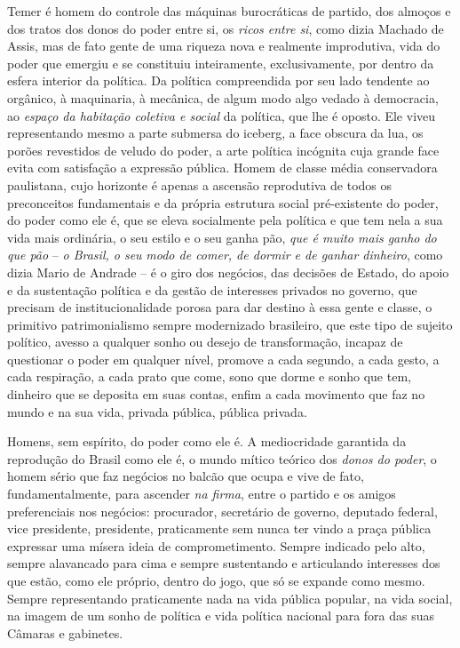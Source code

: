 Temer é homem do controle das máquinas burocráticas de partido, dos
almoços e dos tratos dos donos do poder entre si, os \emph{ricos entre
si}, como dizia Machado de Assis, mas de fato gente de uma riqueza nova
e realmente improdutiva, vida do poder que emergiu e se constituiu
inteiramente, exclusivamente, por dentro da esfera interior da política.
Da política compreendida por seu lado tendente ao orgânico, à
maquinaria, à mecânica, de algum modo algo vedado à democracia, ao
\emph{espaço da habitação coletiva e social} da política, que lhe é
oposto. Ele viveu representando mesmo a parte submersa do iceberg, a
face obscura da lua, os porões revestidos de veludo do poder, a arte
política incógnita cuja grande face evita com satisfação a expressão
pública. Homem de classe média conservadora paulistana, cujo horizonte é
apenas a ascensão reprodutiva de todos os preconceitos fundamentais e da
própria estrutura social pré-existente do poder, do poder como ele é,
que se eleva socialmente pela política e que tem nela a sua vida mais
ordinária, o seu estilo e o seu ganha pão, \emph{que é muito mais ganho
do que pão} -- \emph{o Brasil, o seu} \emph{modo de comer, de dormir e
de ganhar dinheiro}, como dizia Mario de Andrade -- é o giro dos
negócios, das decisões de Estado, do apoio e da sustentação política e
da gestão de interesses privados no governo, que precisam de
institucionalidade porosa para dar destino à essa gente e classe, o
primitivo patrimonialismo sempre modernizado brasileiro, que este tipo
de sujeito político, avesso a qualquer sonho ou desejo de transformação,
incapaz de questionar o poder em qualquer nível, promove a cada segundo,
a cada gesto, a cada respiração, a cada prato que come, sono que dorme e
sonho que tem, dinheiro que se deposita em suas contas, enfim a cada
movimento que faz no mundo e na sua vida, privada pública, pública
privada.

Homens, sem espírito, do poder como ele é. A mediocridade garantida da
reprodução do Brasil como ele é, o mundo mítico teórico dos \emph{donos
do poder}, o homem sério que faz negócios no balcão que ocupa e vive de
fato, fundamentalmente, para ascender \emph{na firma}, entre o partido e
os amigos preferenciais nos negócios: procurador, secretário de governo,
deputado federal, vice presidente, presidente, praticamente sem nunca
ter vindo a praça pública expressar uma mísera ideia de comprometimento.
Sempre indicado pelo alto, sempre alavancado para cima e sempre
sustentando e articulando interesses dos que estão, como ele próprio,
dentro do jogo, que só se expande como mesmo. Sempre representando
praticamente nada na vida pública popular, na vida social, na imagem de
um sonho de política e vida política nacional para fora das suas Câmaras
e gabinetes.

